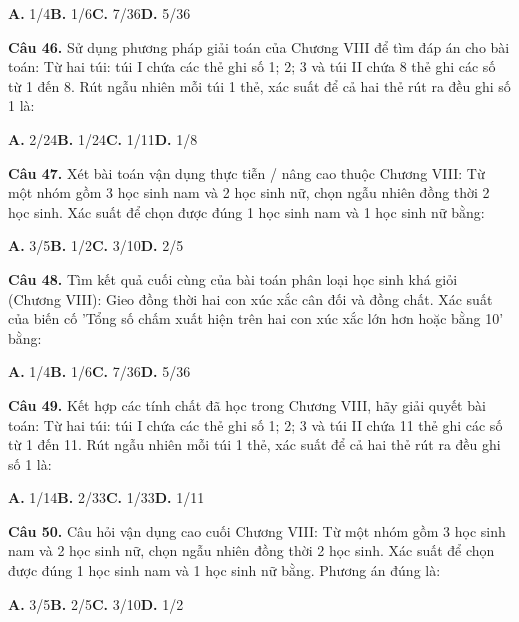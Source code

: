 \documentclass[11pt,a4paper]{article}
\begin{document}
\hspace*{1.5em}\textbf{A.} 1/4\quad\quad \textbf{B.} 1/6\quad\quad \textbf{C.} 7/36\quad\quad \textbf{D.} 5/36\par\vspace{2pt}
\textbf{\color{primary} Câu 46.} Sử dụng phương pháp giải toán của Chương VIII để tìm đáp án cho bài toán: Từ hai túi: túi I chứa các thẻ ghi số 1; 2; 3 và túi II chứa 8 thẻ ghi các số từ 1 đến 8. Rút ngẫu nhiên mỗi túi 1 thẻ, xác suất để cả hai thẻ rút ra đều ghi số 1 là:\par
\hspace*{1.5em}\textbf{A.} 2/24\quad\quad \textbf{B.} 1/24\quad\quad \textbf{C.} 1/11\quad\quad \textbf{D.} 1/8\par\vspace{2pt}
\textbf{\color{primary} Câu 47.} Xét bài toán vận dụng thực tiễn / nâng cao thuộc Chương VIII: Từ một nhóm gồm 3 học sinh nam và 2 học sinh nữ, chọn ngẫu nhiên đồng thời 2 học sinh. Xác suất để chọn được đúng 1 học sinh nam và 1 học sinh nữ bằng:\par
\hspace*{1.5em}\textbf{A.} 3/5\quad\quad \textbf{B.} 1/2\quad\quad \textbf{C.} 3/10\quad\quad \textbf{D.} 2/5\par\vspace{2pt}
\textbf{\color{primary} Câu 48.} Tìm kết quả cuối cùng của bài toán phân loại học sinh khá giỏi (Chương VIII): Gieo đồng thời hai con xúc xắc cân đối và đồng chất. Xác suất của biến cố 'Tổng số chấm xuất hiện trên hai con xúc xắc lớn hơn hoặc bằng 10' bằng:\par
\hspace*{1.5em}\textbf{A.} 1/4\quad\quad \textbf{B.} 1/6\quad\quad \textbf{C.} 7/36\quad\quad \textbf{D.} 5/36\par\vspace{2pt}
\textbf{\color{primary} Câu 49.} Kết hợp các tính chất đã học trong Chương VIII, hãy giải quyết bài toán: Từ hai túi: túi I chứa các thẻ ghi số 1; 2; 3 và túi II chứa 11 thẻ ghi các số từ 1 đến 11. Rút ngẫu nhiên mỗi túi 1 thẻ, xác suất để cả hai thẻ rút ra đều ghi số 1 là:\par
\hspace*{1.5em}\textbf{A.} 1/14\quad\quad \textbf{B.} 2/33\quad\quad \textbf{C.} 1/33\quad\quad \textbf{D.} 1/11\par\vspace{2pt}
\textbf{\color{primary} Câu 50.} Câu hỏi vận dụng cao cuối Chương VIII: Từ một nhóm gồm 3 học sinh nam và 2 học sinh nữ, chọn ngẫu nhiên đồng thời 2 học sinh. Xác suất để chọn được đúng 1 học sinh nam và 1 học sinh nữ bằng. Phương án đúng là:\par
\hspace*{1.5em}\textbf{A.} 3/5\quad\quad \textbf{B.} 2/5\quad\quad \textbf{C.} 3/10\quad\quad \textbf{D.} 1/2\par\vspace{2pt}
\end{document}
